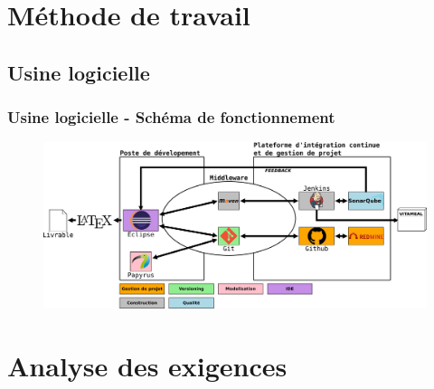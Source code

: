 \documentclass{beamer}
\begin{document}
\section{Méthode de travail}
%

\subsection{Usine logicielle}
\begin{frame}[label=schemaFonctionnement]
  \frametitle{Usine logicielle - Schéma de fonctionnement}
\begin{figure}[H]
\label{schema}
  \centering
      \includegraphics[width=1.0\textwidth]{usine_vitameal.png} %
\end{figure}
\end{frame}

\section{Analyse des exigences}
\end{document}
